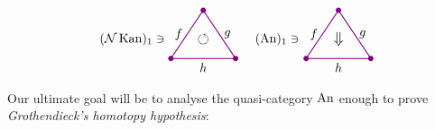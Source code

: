         \begin{equation*}
            \begin{tikzpicture}[
                scale=0.9, 
                thick, 
                color=violet, 
                every node/.style={text=black},
                dot/.style={circle, fill=violet, inner sep=1.5pt, outer sep=0pt}
            ]

                \coordinate (O) at (0,0);       %
                \coordinate (A) at (1, 1.5);    %
                \coordinate (B) at (2, 0);      %

                \draw (O) -- node[left] {$f$} (A) 
                    -- node[right] {$g$} (B) 
                    -- node[below] {$h$} cycle;

                \node[dot] at (O) {};
                \node[dot] at (A) {};
                \node[dot] at (B) {};

                \node[scale=1.0] at (-1.2, 0.6) {$(\Nn \Kan)_1 \ni$};

                \node[scale=1.2] at (1, 0.6) {$\circlearrowleft$};

            \end{tikzpicture}
            \quad
            \begin{tikzpicture}[
                scale=0.9, 
                thick, 
                color=violet, 
                every node/.style={text=black},
                dot/.style={circle, fill=violet, inner sep=1.5pt, outer sep=0pt}
            ]

                \coordinate (O) at (0,0);       %
                \coordinate (A) at (1, 1.5);    %
                \coordinate (B) at (2, 0);      %

                \draw (O) -- node[left] {$f$} (A) 
                    -- node[right] {$g$} (B) 
                    -- node[below] {$h$} cycle;

                \node[dot] at (O) {};
                \node[dot] at (A) {};
                \node[dot] at (B) {};

\                %
                \node[scale=1.0] at (-0.9, 0.6) {$(\An)_1 \ni$};

                \node[scale=1.3] at (1, 0.6) {$\Downarrow$};

            \end{tikzpicture}
        \end{equation*}
        Our ultimate goal will be to analyse the quasi-category $\operatorname{An}$ enough to prove \emph{Grothendieck's homotopy hypothesis}:

